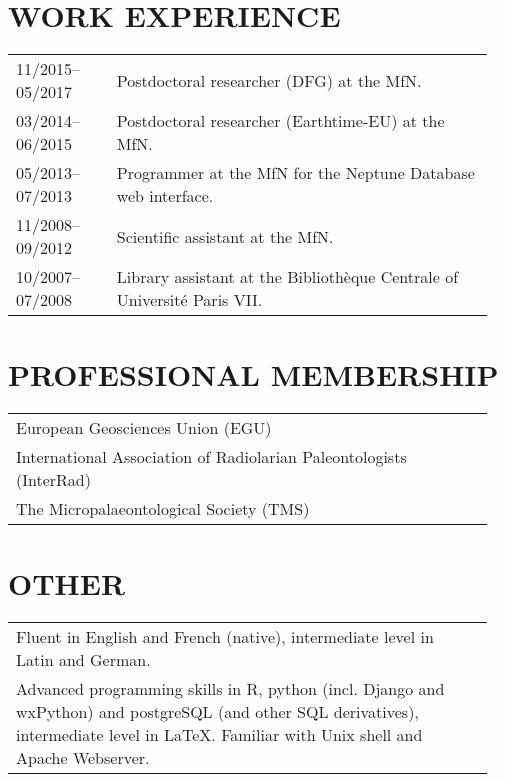 \documentclass[11pt, a4paper]{article}
\begin{document}
\section{WORK EXPERIENCE}
\begin{longtable}{p{0.2\linewidth} P{0.75\linewidth}}
11/2015--05/2017 & Postdoctoral researcher (DFG) at the MfN.\\
03/2014--06/2015 & Postdoctoral researcher (Earthtime-EU) at the MfN.\\
05/2013--07/2013 & Programmer at the MfN for the Neptune Database web interface.\\
11/2008--09/2012 & Scientific assistant at the MfN.\\
10/2007--07/2008 & Library assistant at the Biblioth\`{e}que Centrale of Universit\'{e} Paris VII.\\
\end{longtable}

\section{PROFESSIONAL MEMBERSHIP}
\begin{longtable}{p{0.94\linewidth} p{0.01\linewidth}}
European Geosciences Union (EGU)&\\
International Association of Radiolarian Paleontologists (InterRad)&\\
The Micropalaeontological Society (TMS)&\\
\end{longtable}

\section{OTHER}
\begin{longtable}{P{0.94\linewidth} p{0.01\linewidth}}
Fluent in English and French (native), intermediate level in Latin and German. & \\
Advanced programming skills in R, python (incl. Django and wxPython) and postgreSQL (and other SQL derivatives), intermediate level in \LaTeX. Familiar with Unix shell and Apache Webserver. & \\
\end{longtable}
\end{document}
